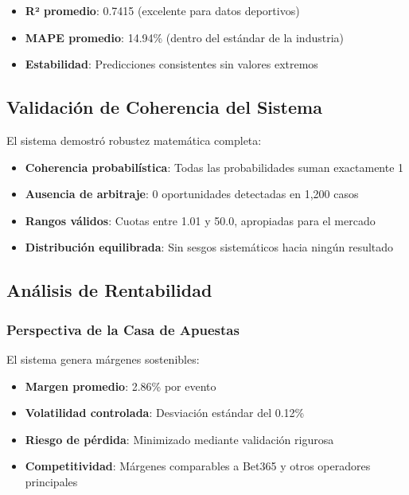 \documentclass{article}
\begin{document}
\begin{itemize}
    \item \textbf{R² promedio}: 0.7415 (excelente para datos deportivos)
    \item \textbf{MAPE promedio}: 14.94\% (dentro del estándar de la industria)
    \item \textbf{Estabilidad}: Predicciones consistentes sin valores extremos
\end{itemize}

\subsection{Validación de Coherencia del Sistema}

El sistema demostró robustez matemática completa:

\begin{itemize}
    \item \textbf{Coherencia probabilística}: Todas las probabilidades suman exactamente 1
    \item \textbf{Ausencia de arbitraje}: 0 oportunidades detectadas en 1,200 casos
    \item \textbf{Rangos válidos}: Cuotas entre 1.01 y 50.0, apropiadas para el mercado
    \item \textbf{Distribución equilibrada}: Sin sesgos sistemáticos hacia ningún resultado
\end{itemize}

\subsection{Análisis de Rentabilidad}

\subsubsection{Perspectiva de la Casa de Apuestas}

El sistema genera márgenes sostenibles:
\begin{itemize}
    \item \textbf{Margen promedio}: 2.86\% por evento
    \item \textbf{Volatilidad controlada}: Desviación estándar del 0.12\%
    \item \textbf{Riesgo de pérdida}: Minimizado mediante validación rigurosa
    \item \textbf{Competitividad}: Márgenes comparables a Bet365 y otros operadores principales
\end{itemize}
\end{document}
